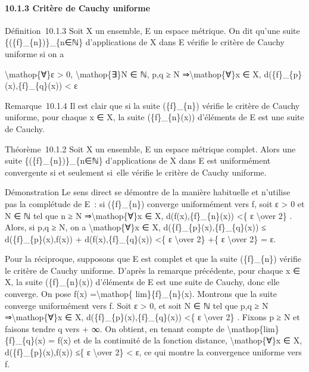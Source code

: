 \documentclass[]{article}
\begin{document}
\paragraph{10.1.3 Critère de Cauchy uniforme}

Définition~10.1.3 Soit X un ensemble, E un espace métrique. On dit
qu'une suite \{(\{f\}\_\{n\})\}\_\{n∈ℕ\} d'applications de X dans E
vérifie le critère de Cauchy uniforme si on a

\textbackslash{}mathop\{∀\}ε \textgreater{} 0,
\textbackslash{}mathop\{∃\}N ∈ ℕ, p,q ≥ N ⇒\textbackslash{}mathop\{∀\}x
∈ X, d(\{f\}\_\{p\}(x),\{f\}\_\{q\}(x)) \textless{} ε

Remarque~10.1.4 Il est clair que si la suite (\{f\}\_\{n\}) vérifie le
critère de Cauchy uniforme, pour chaque x ∈ X, la suite
(\{f\}\_\{n\}(x)) d'éléments de E est une suite de Cauchy.

Théorème~10.1.2 Soit X un ensemble, E un espace métrique complet. Alors
une suite \{(\{f\}\_\{n\})\}\_\{n∈ℕ\} d'applications de X dans E est
uniformément convergente si et seulement si~elle vérifie le critère de
Cauchy uniforme.

Démonstration Le sens direct se démontre de la manière habituelle et
n'utilise pas la complétude de E~: si (\{f\}\_\{n\}) converge
uniformément vers f, soit ε \textgreater{} 0 et N ∈ ℕ tel que n ≥ N
⇒\textbackslash{}mathop\{∀\}x ∈ X, d(f(x),\{f\}\_\{n\}(x)) \textless{}\{
ε \textbackslash{}over 2\} . Alors, si p,q ≥ N, on a
\textbackslash{}mathop\{∀\}x ∈ X, d(\{f\}\_\{p\}(x),\{f\}\_\{q\}(x)) ≤
d(\{f\}\_\{p\}(x),f(x)) + d(f(x),\{f\}\_\{q\}(x)) \textless{}\{ ε
\textbackslash{}over 2\} +\{ ε \textbackslash{}over 2\} = ε.

Pour la réciproque, supposons que E est complet et que la suite
(\{f\}\_\{n\}) vérifie le critère de Cauchy uniforme. D'après la
remarque précédente, pour chaque x ∈ X, la suite (\{f\}\_\{n\}(x))
d'éléments de E est une suite de Cauchy, donc elle converge. On pose
f(x) =\textbackslash{}mathop\{ lim\}\{f\}\_\{n\}(x). Montrons que la
suite converge uniformément vers f. Soit ε \textgreater{} 0, et soit N ∈
ℕ tel que p,q ≥ N ⇒\textbackslash{}mathop\{∀\}x ∈ X,
d(\{f\}\_\{p\}(x),\{f\}\_\{q\}(x)) \textless{}\{ ε \textbackslash{}over
2\} . Fixons p ≥ N et faisons tendre q vers + ∞. On obtient, en tenant
compte de \textbackslash{}mathop\{lim\}\{f\}\_\{q\}(x) = f(x) et de la
continuité de la fonction distance, \textbackslash{}mathop\{∀\}x ∈ X,
d(\{f\}\_\{p\}(x),f(x)) ≤\{ ε \textbackslash{}over 2\} \textless{} ε, ce
qui montre la convergence uniforme vers f.
\end{document}
